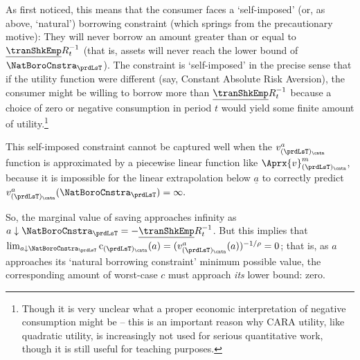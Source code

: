 \documentclass[titlepage, headings=optiontotocandhead]{econtex}
\begin{document}
As \cite{zeldesStochastic} first noticed, this means that the consumer faces a `self-imposed' (or, as above, `natural') borrowing constraint (which springs from the precautionary motive): They will never borrow an amount greater than or equal to $\underline{\tranShkEmp}R_{t}^{-1}$ (that is, assets will never reach the lower bound of $\NatBoroCnstra_{\prdLsT}$).  The constraint is `self-imposed' in the precise sense that if the utility function were different (say, Constant Absolute Risk Aversion), the consumer might be willing to borrow more than $\underline{\tranShkEmp}R_{t}^{-1}$ because a choice of zero or negative consumption in period $t$ would yield some finite amount of utility.\footnote{Though it is very unclear what a proper economic interpretation of negative consumption might be -- this is an important reason why CARA utility, like quadratic utility, is increasingly not used for serious quantitative work, though it is still useful for teaching purposes.}

This self-imposed constraint cannot be captured well when the $v^{a}_{(\prdLsT)_\cntn}$ function is approximated by a piecewise linear function like $\Aprx{v}^{m}_{(\prdLsT)_\cntn}$, because it is impossible for the linear extrapolation below ${\underline{a}}$ to correctly predict $v^{a}_{(\prdLsT)_\cntn}(\NatBoroCnstra_{\prdLsT})=\infty.$ %


So, the marginal value of saving approaches infinity as $a \downarrow \NatBoroCnstra_{\prdLsT}=-\underline{\tranShkEmp}R_{t}^{-1}$.  But this implies that $\lim_{a \downarrow \NatBoroCnstra_{\prdLsT}} \mathrm{c}_{(\prdLsT)_\cntn}(a) = (v^{a}_{(\prdLsT)_\cntn}(a))^{-1/\rho} = 0$; that is, as $a$ approaches its `natural borrowing constraint' minimum possible value, the corresponding amount of worst-case $c$ must approach \textit{its} lower bound: zero.
\end{document}
